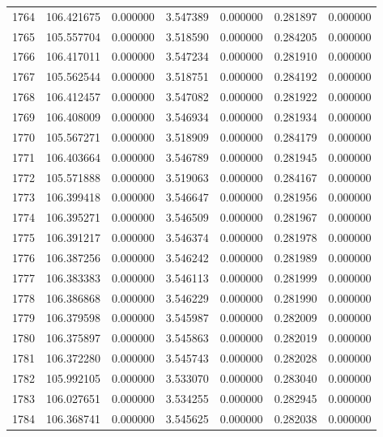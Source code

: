 \begin{tabular}{rrrrrrr}
1764 & 106.421675 &    0.000000 &  3.547389 &   0.000000 &   0.281897 &  0.000000 \\
1765 & 105.557704 &    0.000000 &  3.518590 &   0.000000 &   0.284205 &  0.000000 \\
1766 & 106.417011 &    0.000000 &  3.547234 &   0.000000 &   0.281910 &  0.000000 \\
1767 & 105.562544 &    0.000000 &  3.518751 &   0.000000 &   0.284192 &  0.000000 \\
1768 & 106.412457 &    0.000000 &  3.547082 &   0.000000 &   0.281922 &  0.000000 \\
1769 & 106.408009 &    0.000000 &  3.546934 &   0.000000 &   0.281934 &  0.000000 \\
1770 & 105.567271 &    0.000000 &  3.518909 &   0.000000 &   0.284179 &  0.000000 \\
1771 & 106.403664 &    0.000000 &  3.546789 &   0.000000 &   0.281945 &  0.000000 \\
1772 & 105.571888 &    0.000000 &  3.519063 &   0.000000 &   0.284167 &  0.000000 \\
1773 & 106.399418 &    0.000000 &  3.546647 &   0.000000 &   0.281956 &  0.000000 \\
1774 & 106.395271 &    0.000000 &  3.546509 &   0.000000 &   0.281967 &  0.000000 \\
1775 & 106.391217 &    0.000000 &  3.546374 &   0.000000 &   0.281978 &  0.000000 \\
1776 & 106.387256 &    0.000000 &  3.546242 &   0.000000 &   0.281989 &  0.000000 \\
1777 & 106.383383 &    0.000000 &  3.546113 &   0.000000 &   0.281999 &  0.000000 \\
1778 & 106.386868 &    0.000000 &  3.546229 &   0.000000 &   0.281990 &  0.000000 \\
1779 & 106.379598 &    0.000000 &  3.545987 &   0.000000 &   0.282009 &  0.000000 \\
1780 & 106.375897 &    0.000000 &  3.545863 &   0.000000 &   0.282019 &  0.000000 \\
1781 & 106.372280 &    0.000000 &  3.545743 &   0.000000 &   0.282028 &  0.000000 \\
1782 & 105.992105 &    0.000000 &  3.533070 &   0.000000 &   0.283040 &  0.000000 \\
1783 & 106.027651 &    0.000000 &  3.534255 &   0.000000 &   0.282945 &  0.000000 \\
1784 & 106.368741 &    0.000000 &  3.545625 &   0.000000 &   0.282038 &  0.000000 \\

\end{tabular}
